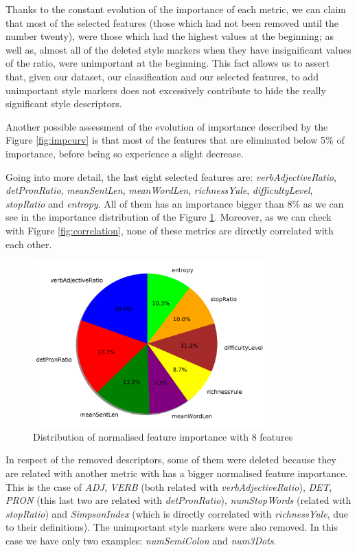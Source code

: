 Thanks to the constant evolution of the importance of each metric, we can claim that most of the selected features (those which had not been removed until the number twenty), were those which had the highest values at the beginning; as well as, almost all of the deleted style markers when they have insignificant values of the ratio, were unimportant at the beginning. This fact allows us to assert that, given our dataset, our classification and our selected features, to add unimportant style markers does not excessively contribute to hide the really significant style descriptors.

Another possible assessment of the evolution of importance described by the Figure \ref{fig:impcurv} is that most of the features that are eliminated below 5\% of importance, before being so experience a slight decrease.

Going into more detail, the last eight selected features are: \textit{verbAdjectiveRatio}, \textit{detPronRatio}, \textit{meanSentLen}, \textit{meanWordLen}, \textit{richnessYule}, \textit{difficultyLevel}, \textit{stopRatio} and \textit{entropy}. All of them has an importance bigger than 8\% as we can see in the importance distribution of the Figure \ref{fig:nfi8}. Moreover, as we can check with Figure \ref{fig:correlation}, none of these metrics are directly correlated with each other.

\begin{figure}
	\centering%
	\centerline{\includegraphics[width=0.8\textwidth]{Imagenes/Bitmap/DecisionTrees/pie8.png}}%
	\caption{Distribution of normalised feature importance with 8 features}%
	\label{fig:nfi8}
\end{figure}

In respect of the removed descriptors, some of them were deleted because they are related with another metric with has a bigger normalised feature importance. This is the case of \textit{ADJ}, \textit{VERB} (both related with \textit{verbAdjectiveRatio}), \textit{DET}, \textit{PRON} (this last two are related with \textit{detPronRatio}), \textit{numStopWords} (related with \textit{stopRatio}) and \textit{SimpsonIndex} (which is directly correlated with \textit{richnessYule}, due to their definitions). The unimportant style markers were also removed. In this case we have only two examples: \textit{numSemiColon} and \textit{num3Dots}.

